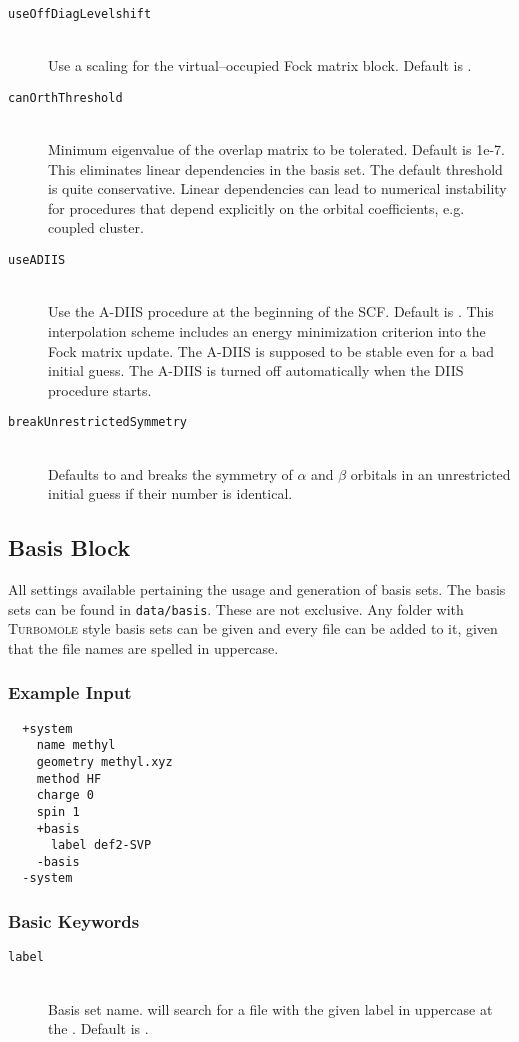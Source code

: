 \begin{description}
    \item [\texttt{useOffDiagLevelshift}]\hfill \\
    Use a scaling for the virtual--occupied Fock matrix block. Default is .
    \item [\texttt{canOrthThreshold}]\hfill \\
    Minimum eigenvalue of the overlap matrix to be tolerated. Default is 1e-7. This eliminates linear dependencies
    in the basis set. The default threshold is quite conservative. Linear dependencies can lead to numerical instability
    for procedures that depend explicitly on the orbital coefficients, e.g. coupled cluster.
    \item [\texttt{useADIIS}]\hfill \\
    Use the A-DIIS procedure \cite{hu2010} at the beginning of the SCF. Default is . This interpolation scheme
    includes an energy minimization criterion into the Fock matrix update. The A-DIIS is supposed to be stable even for a
    bad initial guess. The A-DIIS is turned off automatically when the DIIS procedure starts.
    \item [\texttt{breakUnrestrictedSymmetry}]\hfill\\
    Defaults to  and breaks the symmetry of $\alpha$ and $\beta$ orbitals in an unrestricted initial guess if their number is identical.
 \end{description}

\subsection{Basis Block}\label{sec:system:basis}
All settings available pertaining the usage and generation of basis sets.
The basis sets can be found in \texttt{data/basis}. These are not exclusive. Any folder with \textsc{Turbomole}
style basis sets can be given and every file can be added to it, given that the file names are spelled in
uppercase.

\subsubsection{Example Input}
\begin{lstlisting}
  +system
    name methyl
    geometry methyl.xyz
    method HF
    charge 0
    spin 1
    +basis
      label def2-SVP
    -basis
  -system
 \end{lstlisting}
\subsubsection{Basic Keywords}
\begin{description}
 \item [\texttt{label}]\hfill \\
 Basis set name. \serenity will search for a file with the given label in uppercase at the . Default is .

\end{description}
